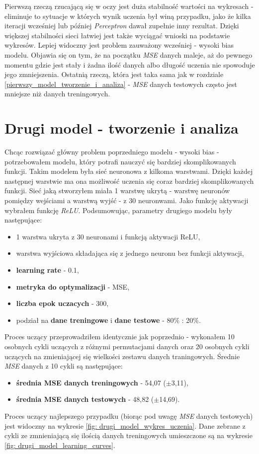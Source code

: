 \documentclass[12pt]{aghdpl}
\begin{document}
		Pierwszą rzeczą rzucającą się w oczy jest duża stabilność wartości na wykresach - eliminuje to sytuacje w których wynik uczenia był winą przypadku, jako że kilka iteracji wcześniej lub później \textit{Perceptron} dawał zupełnie inny rezultat. Dzięki większej stabilności sieci łatwiej jest także wyciągać wnioski na podstawie wykresów. Lepiej widoczny jest problem zauważony wcześniej - wysoki bias modelu. Objawia się on tym, że na początku \textit{MSE} danych maleje, aż do pewnego momentu gdzie jest stały i żadna ilość danych albo długość uczenia nie spowoduje jego zmniejszenia. Ostatnią rzeczą, która jest taka sama jak w rozdziale \ref{pierwszy_model_tworzenie_i_analiza} - \textit{MSE} danych testowych często jest mniejsze niż danych treningowych.
		
		\section{Drugi model - tworzenie i analiza}
		Chcąc rozwiązać główny problem poprzedniego modelu - wysoki bias - potrzebowałem modelu, który potrafi nauczyć się bardziej skomplikowanych funkcji. Takim modelem była sieć neuronowa z kilkoma warstwami. Dzięki każdej następnej warstwie ma ona możliwość uczenia się coraz bardziej skomplikowanych funkcji. Sieć jaką stworzyłem miała 1 warstwę ukrytą - warstwę neuronów pomiędzy wejściami a warstwą wyjść - z 30 neuronwami. Jako funkcję aktywacji wybrałem funkcję \textit{ReLU}.
		Podsumowując, parametry drugiego modelu były następujące:
		\begin{itemize}
			\item 1 warstwa ukryta z 30 neuronami i funkcją aktywacji ReLU,
			\item warstwa wyjściowa składająca się z jednego neuronu bez funkcji aktywacji,
			\item \textbf{learning rate} - 0.1,
			\item \textbf{metryka do optymalizacji} - MSE,
			\item \textbf{liczba epok uczacych} - 300,
			\item podział na \textbf{dane treningowe} i \textbf{dane testowe} - 80\% : 20\%.
		\end{itemize}
		
		Proces uczący przeprowadziłem identycznie jak poprzednio - wykonałem 10 osobnych cykli uczących z różnymi permutacjami danych oraz 20 osobnych cykli uczących na zmieniającej się wielkości zestawu danych traningowych. Średnie \textit{MSE} danych z 10 cykli są następujące:
		\begin{itemize}
		\item \textbf{średnia MSE danych treningowych} - 54,07 ($\pm$3,11),
		\item \textbf{średnia MSE danych testowych} - 48,82 ($\pm$14,69).
		\end{itemize}
		Proces uczący najlepszego przypadku (biorąc pod uwagę \textit{MSE} danych testowych) jest widoczny na wykresie \ref{fig: drugi_model_wykres_uczenia}. Dane zebrane z cykli ze zmnieniającą się ilością danych treningowych umieszczone są na wykresie \ref{fig: drugi_model_learning_curves}.
		
\end{document}
